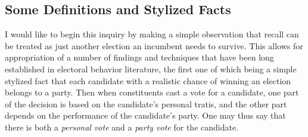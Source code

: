 \documentclass[hyphens, crop=false]{standalone}
\begin{document}
	
	\subsection*{Some Definitions and Stylized Facts}
		I would like to begin this inquiry by making a simple observation that
		recall can be treated as just another election
		an incumbent needs to survive.
		This allows for appropriation of a number of findings and techniques
		that have been long established in electoral behavior literature,
		the first one of which being a simple stylized fact that
		each candidate with a realistic chance of winning an election belongs to a party.
		Then when constituents cast a vote for a candidate,
		one part of the decision is based on the candidate's personal tratis,
		and the other part depends on the performance of the candidate's party. 
		One may thus say that there is both
		a \textit{personal vote}
		and a \textit{party vote} for the candidate.
		
\end{document}
